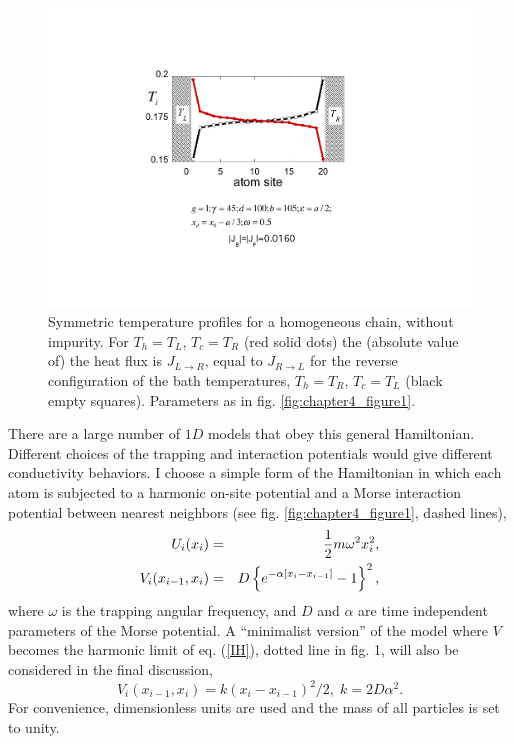 \begin{figure}
\centering
\includegraphics[width=0.65\linewidth]{Figures/FIG2.pdf}
\caption{Symmetric temperature profiles for a homogeneous chain, without impurity.  For $T_{h}=T_{L}$, $T_c=T_R$ (red solid dots) the (absolute value of) the heat flux is $J_{L\rightarrow R}$, equal to $J_{R\rightarrow L}$ for the reverse configuration of the bath temperatures, $T_{h}=T_{R}$, $T_c=T_L$
(black empty squares). Parameters as in fig. \ref{fig:chapter4_figure1}.}
\label{fig:chapter4_figure2}
\end{figure}

There are a large number of $1D$ models that obey this general Hamiltonian. Different choices of the trapping and interaction potentials would give different conductivity behaviors. I choose a simple form of the Hamiltonian in which each atom is subjected to a harmonic on-site potential and a Morse interaction potential between nearest neighbors (see fig. \ref{fig:chapter4_figure1}, dashed lines),
%
\begin{eqnarray}
\label{HO}
U_i(x_i)&=&{1 \over 2} m \omega^2 x^2_i,
\\
\label{IH}
V_i(x_{i-1},x_i)&=&D\left \{e^{-\alpha [x_i-x_{i-1}]}-1\right \}^2,
\end{eqnarray}
%
where $\omega$ is the trapping angular frequency, and $D$ and $\alpha$ are time independent parameters of the Morse potential.
A ``minimalist version'' of the model where $V$ becomes the harmonic limit of eq. (\ref{IH}), dotted line in fig. 1,
 will also be considered in the final discussion,
%
\begin{equation}
\label{Vhar}
{V}_i(x_{i-1},x_i)=k(x_i-x_{i-1})^2/2,\;k=2D\alpha^2.
\end{equation}
%
For convenience, dimensionless units are used and the mass of all particles is set to unity.

